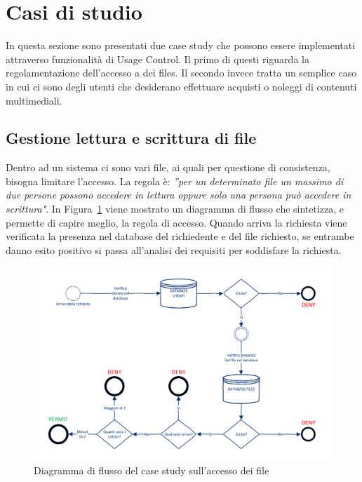 \section{Casi di studio}
\label{sec:casi_studio}
In questa sezione sono presentati due case study che possono essere implementati attraverso funzionalità di Usage Control. Il primo di questi riguarda la 
regolamentazione dell'accesso a dei files. Il secondo invece tratta un semplice caso in cui ci sono 
degli utenti che desiderano effettuare acquisti o noleggi di contenuti multimediali.


\subsection{Gestione lettura e scrittura di file} %
\label{sub:case1}

Dentro ad un sistema ci sono vari file, ai quali per questione di consistenza, bisogna limitare l'accesso.
La regola è: \textit{”per un determinato file un massimo di due persone possono accedere in lettura oppure solo una persona può accedere in scrittura"}. In Figura~\ref{fig:diagrammaflussoprimoesempio} viene mostrato un diagramma di flusso che sintetizza, e permette di capire meglio, la regola di accesso. Quando arriva la richiesta viene verificata la presenza nel database del richiedente e del file richiesto, se entrambe danno esito positivo si passa all'analisi dei requisiti per soddisfare la richiesta. \par


\begin{figure}[h]
	\centering 
	\includegraphics[width = 1.0\textwidth]{./Visio_Project/DiagrammaFlussoPrimoEsempio.pdf}
 	\caption{Diagramma di flusso del case study sull'accesso dei file}
 	\label{fig:diagrammaflussoprimoesempio}
\end{figure}

